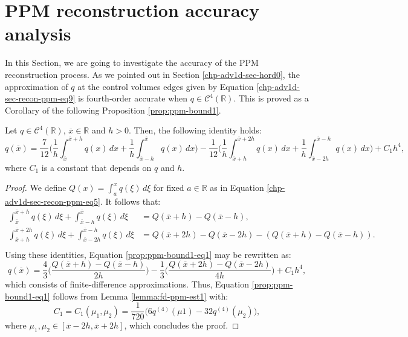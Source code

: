 \section{PPM reconstruction accuracy analysis}
\label{chp-adv1d-sec-numerical-analysis-ppm}
In this Section, we are going to investigate the accuracy of the PPM reconstruction process.
As we pointed out in Section \ref{chp-adv1d-sec-hord0}, the approximation of $q$ at the control volumes edges
given by Equation \eqref{chp-adv1d-sec-recon-ppm-eq9} is fourth-order accurate when $q \in \mathcal{C}^4(\mathbb{R})$. 
This is proved as a Corollary of the following Proposition \ref{prop:ppm-bound1}.
\begin{prop}
	\label{prop:ppm-bound1}
	Let $q \in \mathcal{C}^{4}(\mathbb{R})$, $\overline{x} \in \mathbb{R} $ and $h>0$.
	Then, the following identity holds:
	\begin{equation}
		\label{prop:ppm-bound1-eq1}
		q(\overline{x} ) = \frac{7}{12}\bigg( \frac{1}{h} \int_{\overline{x} }^{\overline{x}+h} q(x) \,dx 
		+ \frac{1}{h} \int_{\overline{x} -h}^{\overline{x} } q(x) \,dx  \bigg)
		- \frac{1}{12}\bigg( \frac{1}{h} \int_{\overline{x} +h}^{\overline{x}+2h} q(x) \,dx 
		+ \frac{1}{h} \int_{\overline{x} -2h}^{\overline{x} -h} q(x) \,dx  \bigg) + C_1h^4,
	\end{equation}
	where $C_1$ is a constant that depends on $q$ and $h$.
\end{prop}
\begin{proof}
	We define $Q(x) = \int_{a}^{x} q(\xi) \,d\xi$ for fixed $a \in \mathbb{R}$ as in 
	Equation \eqref{chp-adv1d-sec-recon-ppm-eq5}. It follows that:
	\begin{align*}
		\int_{\overline{x}}^{\overline{x}+h} q(\xi) \,d\xi + \int_{\overline{x}-h}^{\overline{x}} q(\xi) \,d\xi &=
		Q(\overline{x}+h) - Q(\overline{x}-h), \\
		\int_{\overline{x}+h}^{\overline{x}+2h} q(\xi) \,d\xi + \int_{\overline{x}-2h}^{\overline{x}-h} q(\xi) \,d\xi &=
		Q(\overline{x}+2h) - Q(\overline{x}-2h) - (Q(\overline{x}+h) - Q(\overline{x}-h)). \\
	\end{align*}
	Using these identities, Equation \eqref{prop:ppm-bound1-eq1} may be rewritten as:
	\begin{equation}
		\label{prop:ppm-bound1-eq2}
		q(\overline{x}) = \frac{4}{3} \bigg(\frac{Q(\overline{x}+h) - Q(\overline{x}-h)}{2h}\bigg)
		- \frac{1}{3} \bigg(\frac{Q(\overline{x}+2h) - Q(\overline{x}-2h)}{4h}\bigg) + C_1h^4,
	\end{equation}
	which consists of finite-difference approximations. 
	Thus, Equation \eqref{prop:ppm-bound1-eq1} follows from Lemma \ref{lemma:fd-ppm-est1}
	with:
	\begin{equation}
		\label{prop:ppm-bound1-eq3}
		C_1 = C_1(\mu_1,\mu_2) = \frac{1}{720}\bigg(6q^{(4)}(\mu{1}) -32q^{(4)}(\mu_{2})\bigg), 
	\end{equation}
	where $\mu_{1}, \mu_{2} \in [\overline{x}-2h,\overline{x}+2h]$,
	which concludes the proof.
\end{proof}
